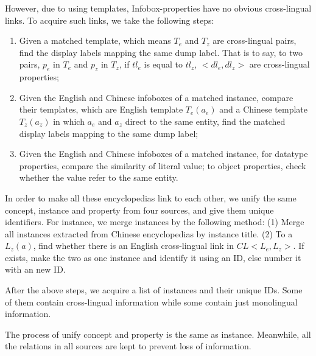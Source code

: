 \documentclass[runningheads,a4paper]{llncs}
\begin{document}
However, due to using templates, Infobox-properties have no obvious cross-lingual links. To acquire such links, we take the following steps: 
\begin{enumerate}[1)]
    \item Given a matched template, which means $T_{e}$ and $T_{z}$ are cross-lingual pairs, find the display labels mapping the same dump label. That is to say, to two pairs, $p_{e}$ in $T_{e}$ and $p_{z}$ in $T_{z}$, if $tl_{e}$ is equal to $tl_{z}$, $<dl_{e},dl_{z}>$ are cross-lingual properties;
    \item Given the English and Chinese infoboxes of a matched instance, compare their templates, which are English template $T_{e}(a_{e})$ and a Chinese template $T_{z}(a_{z})$ in which $a_{e}$ and $a_{z}$ direct to the same entity, find the matched display labels mapping to the same dump label; 
    \item Given the English and Chinese infoboxes of a matched instance, for datatype properties, compare the similarity of literal value; to object properties, check whether the value refer to the same entity. 
\end{enumerate}

In order to make all these encyclopedias link to each other, we unify the same concept, instance and property from four sources, and give them unique identifiers. For instance, we merge instances by the following method: (1) Merge all instances extracted from Chinese encyclopedias by instance title. (2) To a $L_{z}(a)$, find whether there is an English cross-lingual link in $CL<L_{e}, L_{z}>$. If exists, make the two as one instance and identify it using an ID, else number it with an new ID.

After the above steps, we acquire a list of instances and their unique IDs. Some of them contain cross-lingual information while some contain just monolingual information.

The process of unify concept and property is the same as instance. Meanwhile, all the relations in all sources are kept to prevent loss of information.
\end{document}
